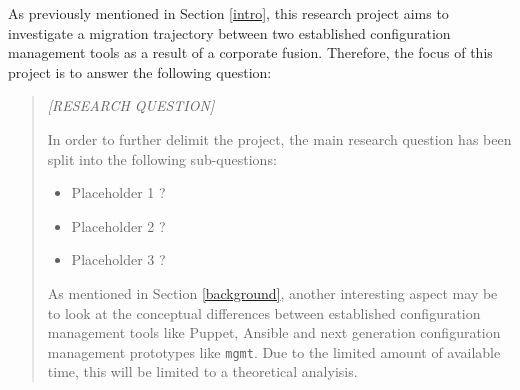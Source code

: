 As previously mentioned in Section \ref{intro}, this research project aims to investigate a migration trajectory between two established configuration management tools as a result of a corporate fusion. Therefore, the focus of this project is to answer the following question:

\begin{quote}
\textit{[RESEARCH QUESTION]}

In order to further delimit the project, the main research question has been split into the following sub-questions:

\begin{itemize}
    \item Placeholder 1 ?
    \item Placeholder 2 ?
    \item Placeholder 3 ?
\end{itemize}

As mentioned in Section \ref{background}, another interesting aspect may be to look at the conceptual differences between established configuration management tools like Puppet, Ansible and next generation configuration management prototypes like \texttt{mgmt}. Due to the limited amount of available time, this will be limited to a theoretical analyisis. 

\end{quote}
